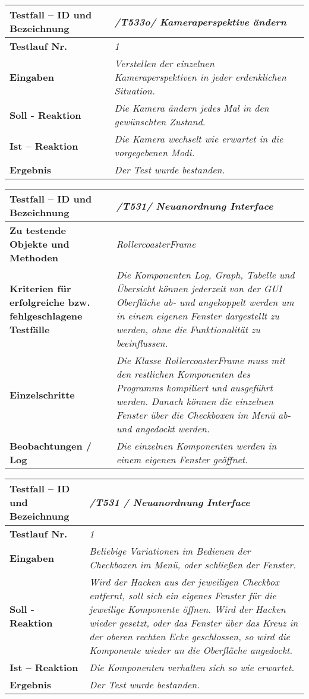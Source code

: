 \begin{longtable}{|p{7cm}|p{10cm}|}
\hline
\textbf{Testfall -- ID und Bezeichnung} & \textit{/T533o/ Kameraperspektive ändern} \\
\hline
\textbf{Testlauf Nr.} & \textit{1} \\
\hline
\textbf{Eingaben} & \textit{Verstellen der einzelnen Kameraperspektiven in jeder erdenklichen Situation.} \\
\hline
\textbf{Soll - Reaktion} & \textit{Die Kamera ändern jedes Mal in den gewünschten Zustand.} \\
\hline
\textbf{Ist -- Reaktion} & \textit{Die Kamera wechselt wie erwartet in die vorgegebenen Modi.} \\
\hline
\textbf{Ergebnis} & \textit{Der Test wurde bestanden.} \\
\hline
\end{longtable}

\begin{longtable}{|p{7cm}|p{10cm}|}
\hline
\textbf{Testfall -- ID und Bezeichnung} &  \textit{/T531/ Neuanordnung Interface} \\
\hline
\textbf{Zu testende Objekte und Methoden} &  \textit{RollercoasterFrame}
\\
\hline
\textbf{Kriterien für erfolgreiche bzw. fehlgeschlagene Testfälle} &
\textit{Die Komponenten Log, Graph, Tabelle und Übersicht können jederzeit von der GUI Oberfläche ab- und angekoppelt werden um in einem eigenen Fenster dargestellt zu werden, ohne die Funktionalität zu beeinflussen.} \\
\hline
\textbf{Einzelschritte} &  \textit{Die Klasse RollercoasterFrame muss mit den restlichen Komponenten des Programms kompiliert und ausgeführt werden. Danach können die einzelnen Fenster über
die Checkboxen im Menü ab- und angedockt werden.} \\
\hline
\textbf{Beobachtungen / Log} &  \textit{Die einzelnen Komponenten werden in einem eigenen Fenster geöffnet.} \\
\hline
\end{longtable}

\begin{longtable}{|p{7cm}|p{10cm}|}
\hline
\textbf{Testfall -- ID und Bezeichnung} & \textit{ /T531 / Neuanordnung Interface} \\
\hline
\textbf{Testlauf Nr.} & \textit{1} \\
\hline
\textbf{Eingaben} & \textit{Beliebige Variationen im Bedienen der Checkboxen im Menü, oder schließen der Fenster.} \\
\hline
\textbf{Soll - Reaktion} & \textit{Wird der Hacken aus der jeweiligen Checkbox entfernt, soll sich ein eigenes Fenster für die jeweilige Komponente öffnen. Wird der Hacken wieder gesetzt, 
oder das Fenster über das Kreuz in der oberen rechten Ecke geschlossen, so wird die Komponente wieder an die Oberfläche angedockt.} \\
\hline
\textbf{Ist -- Reaktion} & \textit{Die Komponenten verhalten sich so wie erwartet.} \\
\hline
\textbf{Ergebnis} & \textit{Der Test wurde bestanden.} \\
\hline
\end{longtable}

